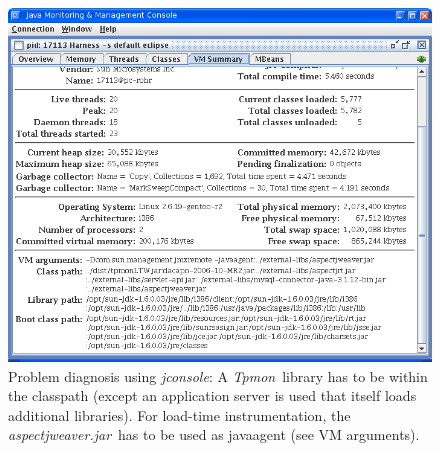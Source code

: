 \documentclass[a4paper,12pt]{scrartcl}
\newcommand{\tpmon}{\textit{Tpmon}}
\newcommand{\tpan}{\textit{Tpan}}
\newcommand{\tpmonltw}{\textit{tpmonltw.jar}}
\newcommand{\aspectjweaverjar}{\textit{aspectjweaver.jar}}
\begin{document}
\begin{figure}
 \centering
 \includegraphics[width=12cm]{snapshot5.png}
 \caption{Problem diagnosis using \textit{jconsole}: A \tpmon\ library has to be within the classpath (except an application server is used that itself loads additional libraries). For load-time instrumentation, the \aspectjweaverjar\ has to be used as javaagent (see VM arguments).}\label{jconsole}
\end{figure}
% 
% 
% 
% 
% 


% 
% 

% 
% 



 

\end{document}
